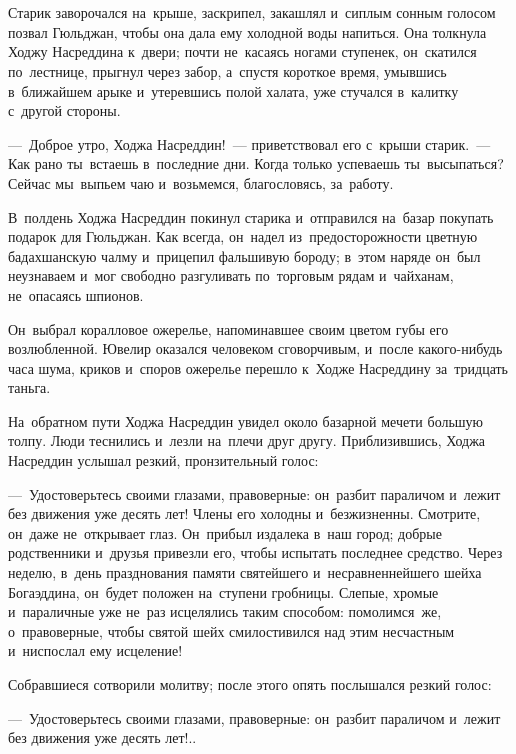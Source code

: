 \documentclass[12pt,a4paper]{book}
\begin{document}
\chapter{}

Старик заворочался на~крыше, заскрипел, закашлял и~сиплым сонным голосом позвал Гюльджан, чтобы она дала ему холодной воды напиться. Она толкнула Ходжу Насреддина к~двери; почти не~касаясь ногами ступенек, он~скатился по~лестнице, прыгнул через забор, а~спустя короткое время, умывшись в~ближайшем арыке и~утеревшись полой халата, уже стучался в~калитку с~другой стороны.

—~Доброе утро, Ходжа Насреддин!~— приветствовал его с~крыши старик.~— Как рано ты~встаешь в~последние дни. Когда только успеваешь ты~высыпаться? Сейчас мы~выпьем чаю и~возьмемся, благословясь, за~работу.

В~полдень Ходжа Насреддин покинул старика и~отправился на~базар покупать подарок для Гюльджан. Как всегда, он~надел из~предосторожности цветную бадахшанскую чалму и~прицепил фальшивую бороду; в~этом наряде он~был неузнаваем и~мог свободно разгуливать по~торговым рядам и~чайханам, не~опасаясь шпионов.

Он~выбрал коралловое ожерелье, напоминавшее своим цветом губы его возлюбленной. Ювелир оказался человеком сговорчивым, и~после какого-нибудь часа шума, криков и~споров ожерелье перешло к~Ходже Насреддину за~тридцать таньга.

На~обратном пути Ходжа Насреддин увидел около базарной мечети большую толпу. Люди теснились и~лезли на~плечи друг другу. Приблизившись, Ходжа Насреддин услышал резкий, пронзительный голос:

—~Удостоверьтесь своими глазами, правоверные: он~разбит параличом и~лежит без движения уже десять лет! Члены его холодны и~безжизненны. Смотрите, он~даже не~открывает глаз. Он~прибыл издалека в~наш город; добрые родственники и~друзья привезли его, чтобы испытать последнее средство. Через неделю, в~день празднования памяти святейшего и~несравненнейшего шейха Богаэддина, он~будет положен на~ступени гробницы. Слепые, хромые и~параличные уже не~раз исцелялись таким способом: помолимся~же, о~правоверные, чтобы святой шейх смилостивился над этим несчастным и~ниспослал ему исцеление!

Собравшиеся сотворили молитву; после этого опять послышался резкий голос:

—~Удостоверьтесь своими глазами, правоверные: он~разбит параличом и~лежит без движения уже десять лет!..
\end{document}

